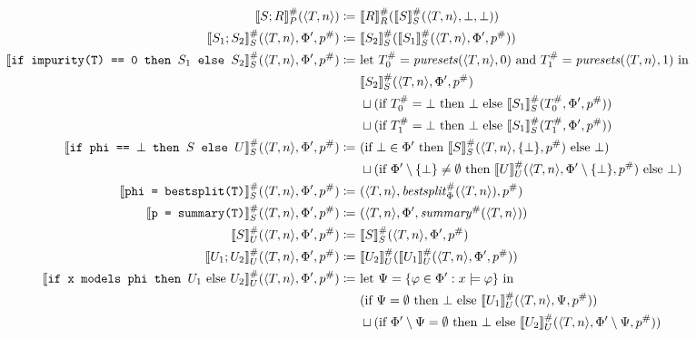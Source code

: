 \begin{figure}
\centering
\newcommand{\argtuple}{\langle T, n \rangle, \Phi', p^\#}
\begin{align*}
\den[P]{S ; R}^\#(\langle T, n \rangle) \coloneqq&~
\den[R]{R}^\#(\den[S]{S}^\#(\langle T, n \rangle, \bot, \bot)) \\
%
\den[S]{S_1 ; S_2}^\#(\argtuple) \coloneqq&~
\den[S]{S_2}^\#(\den[S]{S_1}^\#(\argtuple)) \\
%
\den[S]{\iteimpuritynode{S_1}{S_2}}^\#(\argtuple) \coloneqq&~
\text{let } T_0^\# = \mathit{puresets}(\langle T, n \rangle, 0) \text{ and }
T_1^\# = \mathit{puresets}(\langle T, n \rangle, 1) \text{ in } \\
&~\den[S]{S_2}^\#(\langle T, n \rangle, \Phi', p^\#) \\
&~\sqcup
(\text{if } T_0^\# = \bot \text{ then } \bot \text{ else } \den[S]{S_1}^\#(T_0^\#, \Phi', p^\#)) \\
&~\sqcup
(\text{if } T_1^\# = \bot \text{ then } \bot \text{ else } \den[S]{S_1}^\#(T_1^\#, \Phi', p^\#)) \\
%
\den[S]{\itetrivialnode{S}{U}}^\#(\argtuple) \coloneqq&~
(\text{if } \bot \in \Phi' \text{ then } \den[S]{S}^\#(\langle T, n \rangle, \{\bot\}, p^\#) \text{ else } \bot) \\
&~\sqcup
(\text{if } \Phi' \setminus \{\bot\} \neq \emptyset \text{ then }
\den[U]{U}^\#(\langle T, n \rangle, \Phi' \setminus \{\bot\}, p^\#) \text{ else } \bot)\\
%
\den[S]{\bestsplitnode}^\#(\argtuple)
\coloneqq&~ (\langle T, n \rangle, \mathit{bestsplit}_\Phi^\#(\langle T, n \rangle), p^\#) \\
%
\den[S]{\summarynode}^\#(\argtuple) \coloneqq&~
(\langle T, n \rangle, \Phi', \mathit{summary}^\#(\langle T, n \rangle)) \\
%
\den[U]{S}^\#(\argtuple) \coloneqq&~
\den[S]{S}^\#(\argtuple) \\
%
\den[U]{U_1 ; U_2}^\#(\argtuple) \coloneqq&~
\den[U]{U_2}^\#(\den[U]{U_1}^\#(\argtuple)) \\
%
\den[U]{\itemodelsnode{U_1}{U_2}}^\#(\argtuple) \coloneqq&~
\text{let } \Psi = \{\varphi \in \Phi' : x \models \varphi\} \text{ in } \\
&~(\text{if } \Psi = \emptyset \text{ then } \bot \text{ else }
\den[U]{U_1}^\#(\langle T, n \rangle, \Psi, p^\#)) \\
&~\sqcup
(\text{if } \Phi' \setminus \Psi = \emptyset \text{ then } \bot \text{ else }
\den[U]{U_2}^\#(\langle T, n \rangle, \Phi' \setminus \Psi, p^\#)) \\

\end{align*}
\end{figure}
